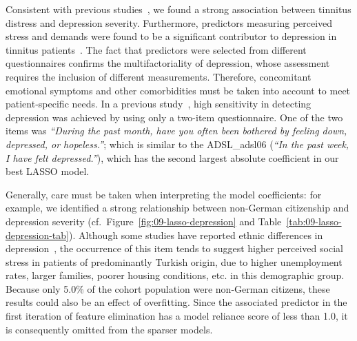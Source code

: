 \documentclass[
  oneside]{book}
\begin{document}
Consistent with previous studies~\autocite{Langguth:TinAndDepression2011}, we found a strong association between tinnitus distress and depression severity.
Furthermore, predictors measuring perceived stress and demands were found to be a significant contributor to depression in tinnitus patients~\autocite{Trevis:TinnitusReview2018}.
The fact that predictors were selected from different questionnaires confirms the multifactoriality of depression, whose assessment requires the inclusion of different measurements.
Therefore, concomitant emotional symptoms and other comorbidities must be taken into account to meet patient-specific needs.
In a previous study~\autocite{Whooley:2q_depression1997}, high sensitivity in detecting depression was achieved by using only a two-item questionnaire.
One of the two items was \emph{``During the past month, have you often been bothered by feeling down, depressed, or hopeless.''};\autocite{Whooley:2q_depression1997} which is similar to the ADSL\_adsl06 (\emph{``In the past week, I have felt depressed.''}), which has the second largest absolute coefficient in our best LASSO model.

Generally, care must be taken when interpreting the model coefficients:
for example, we identified a strong relationship between non-German citizenship and depression severity (cf.~Figure~\ref{fig:09-lasso-depression} and Table~\ref{tab:09-lasso-depression-tab}).
Although some studies have reported ethnic differences in depression~\autocite{Riolo:DepressionEthnicity2005,Weinberger:DepressionEthnicity2018}, the occurrence of this item tends to suggest higher perceived social stress in patients of predominantly Turkish origin, due to higher unemployment rates, larger families, poorer housing conditions, etc. in this demographic group.
Because only 5.0\% of the cohort population were non-German citizens, these results could also be an effect of overfitting.
Since the associated predictor in the first iteration of feature elimination has a model reliance score of less than 1.0, it is consequently omitted from the sparser models.
\end{document}
